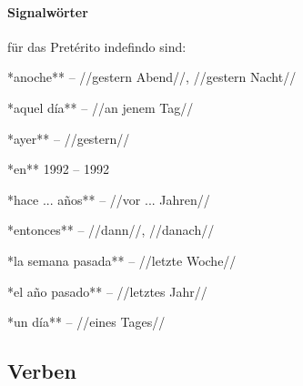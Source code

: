 \paragraph{Signalwörter} für das Pretérito indefindo sind:

\begin{compactitem}
    \item **anoche** -- //gestern Abend//, //gestern Nacht//
    \item **aquel día** -- //an jenem Tag//
    \item **ayer** -- //gestern//
    \item **en** 1992 -- 1992
    \item **hace ... años** -- //vor ... Jahren//
    \item **entonces** -- //dann//, //danach//
    \item **la semana pasada** -- //letzte Woche//
    \item **el año pasado** -- //letztes Jahr//
    \item **un día** -- //eines Tages//
\end{compactitem}

\subsection*{Verben}

